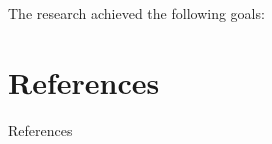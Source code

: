 \documentclass[t]{beamer}  %
\begin{document}
\begin{frame}[c]\frametitle{\insertsection}

  The research achieved the following goals:
\end{frame}



\section{References} %
\label{sec:references}

\begin{frame}[t]{References}  
  
  
\end{frame}

\end{document}
